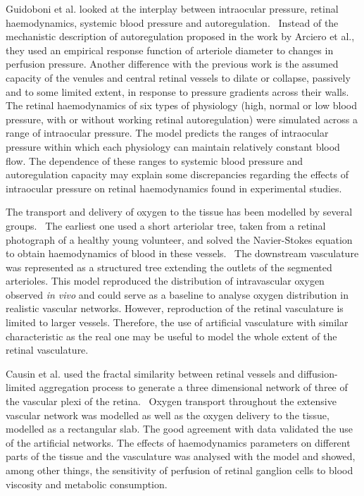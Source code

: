 \documentclass[12pt,a4paper]{journal}
\begin{document}
Guidoboni et al. looked at the interplay between intraocular pressure, retinal haemodynamics, systemic blood pressure and autoregulation.~\cite{Guidoboni_2014a}
Instead of the mechanistic description of autoregulation proposed in the work by Arciero et al., they used an empirical response function of arteriole diameter to changes in perfusion pressure.
Another difference with the previous work is the assumed capacity of the venules and central retinal vessels to dilate or collapse, passively and to some limited extent, in response to pressure gradients across their walls.
The retinal haemodynamics of six types of physiology (high, normal or low blood pressure, with or without working retinal autoregulation) were simulated across a range of intraocular pressure.
The model predicts the ranges of intraocular pressure within which each physiology can maintain relatively constant blood flow.
The dependence of these ranges to systemic blood pressure and autoregulation capacity may explain some discrepancies regarding the effects of intraocular pressure on retinal haemodynamics found in experimental studies.~\cite{Guidoboni_2014a} 

The transport and delivery of oxygen to the tissue has been modelled by several groups.~\cite{Aquah_2021,Causin_2015,Liu_2009}
The earliest one used a short arteriolar tree, taken from a retinal photograph of a healthy young volunteer, and solved the Navier-Stokes equation to obtain haemodynamics of blood in these vessels.~\cite{Liu_2009}
The downstream vasculature was represented as a structured tree extending the outlets of the segmented arterioles.
This model reproduced the distribution of intravascular oxygen observed \textit{in vivo} and could serve as a baseline to analyse oxygen distribution in realistic vascular networks.
However, reproduction of the retinal vasculature is limited to larger vessels.
Therefore, the use of artificial vasculature with similar characteristic as the real one may be useful to model the whole extent of the retinal vasculature.

Causin et al. used the fractal similarity between retinal vessels and diffusion-limited aggregation process to generate a three dimensional network of three of the vascular plexi of the retina.~\cite{Causin_2015}
Oxygen transport throughout the extensive vascular network was modelled as well as the oxygen delivery to the tissue, modelled as a rectangular slab.
The good agreement with data validated the use of the artificial networks.
The effects of haemodynamics parameters on different parts of the tissue and the vasculature was analysed with the model and showed, among other things, the sensitivity of perfusion of retinal ganglion cells to blood viscosity and metabolic consumption.~\cite{Causin_2015}
\end{document}
